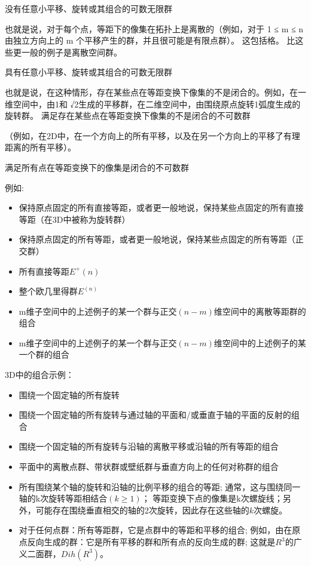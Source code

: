 没有任意小平移、旋转或其组合的可数无限群

也就是说，对于每个点，等距下的像集在拓扑上是离散的（例如，对于 1 ≤ m ≤ n 由独立方向上的 m 个平移产生的群，并且很可能是有限点群）。 这包括格。 比这些更一般的例子是离散空间群。

具有任意小平移、旋转或其组合的可数无限群

也就是说，在这种情形，存在某些点在等距变换下像集的不是闭合的。例如，在一维空间中，由1和 √2生成的平移群，在二维空间中，由围绕原点旋转1弧度生成的旋转群。
满足存在某些点在等距变换下像集的不是闭合的不可数群

（例如，在2D中，在一个方向上的所有平移，以及在另一个方向上的平移了有理距离的所有平移）。

满足所有点在等距变换下的像集是闭合的不可数群

例如:

\begin{itemize}
\item 保持原点固定的所有直接等距，或者更一般地说，保持某些点固定的所有直接等距（在3D中被称为旋转群）
\item 保持原点固定的所有等距，或者更一般地说，保持某些点固定的所有等距（正交群）
\item 所有直接等距$E^+(n)$
\item 整个欧几里得群$E^(n)$
\item m维子空间中的上述例子的某一个群与正交$(n-m)$维空间中的离散等距群的组合
\item m维子空间中的上述例子的某一个群与正交$(n-m)$维空间中的上述例子的某一个群的组合
\end{itemize}

3D中的组合示例：

\begin{itemize}
\item 围绕一个固定轴的所有旋转
\item 围绕一个固定轴的所有旋转与通过轴的平面和/或垂直于轴的平面的反射的组合
\item 围绕一个固定轴的所有旋转与沿轴的离散平移或沿轴的所有等距的组合
\item 平面中的离散点群、带状群或壁纸群与垂直方向上的任何对称群的组合
\item 所有围绕某个轴的旋转和沿轴的比例平移的组合的等距; 通常，这与围绕同一轴的k次旋转等距相结合$(k \geq 1)$； 等距变换下点的像集是k次螺旋线；另外，可能存在围绕垂直相交的轴的2次旋转，因此存在这些轴的$k$次螺旋。
\item 对于任何点群：所有等距群，它是点群中的等距和平移的组合; 例如，由在原点反向生成的群：它是所有平移的群和所有点的反向生成的群; 这就是$R^3$的广义二面群，$Dih(R^3)$。
\end{itemize}

